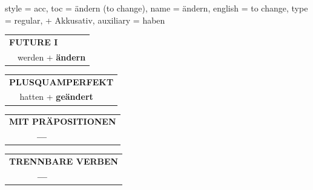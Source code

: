 \begin{verbentry}{
  style = {acc},
  toc = {ändern (to change)},
  name = {ändern},
  english = {to change},
  type = {regular, + Akkusativ},
  auxiliary = {haben}
}
\begin{tabular}{rl}
    \multicolumn{2}{l}{\textbf{FUTURE I} }\\
  &  werden + \textbf{ändern}\\
 
  \end{tabular}
\hfill
   \begin{tabular}{rl}
      \multicolumn{2}{l}{\textbf{PLUSQUAMPERFEKT}}\\
  &  hatten + \textbf{geändert}\\
  \end{tabular}
  

  \vspace{10pt}

\begin{tabular}{lll}
\multicolumn{3}{l}{\textbf{MIT PRÄPOSITIONEN}}\\
& \textbf{---} & \\
\end{tabular}
\hfill
\begin{tabular}{lll}
\multicolumn{3}{l}{\textbf{TRENNBARE VERBEN}}\\
& \textbf{---} & \\
\end{tabular}

  \vspace{-5pt}
\end{verbentry}

